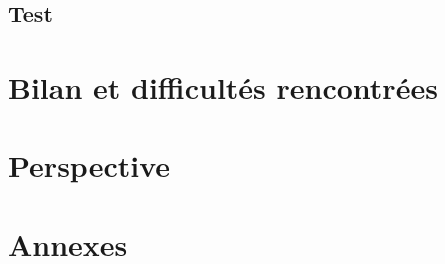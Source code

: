 \documentclass[oneside,13pt,a4paper]{report}
\begin{document}
        \section{Test}



    \chapter{Bilan et difficultés rencontrées}


    \chapter{Perspective}


    \chapter{Annexes}

    
\end{document}
